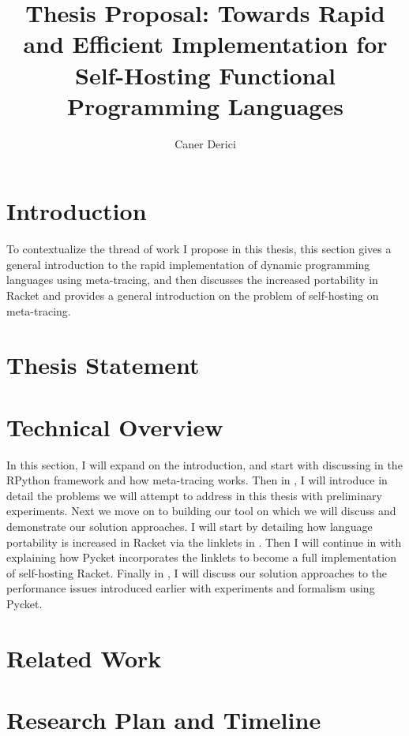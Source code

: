 \documentclass[9pt]{extarticle}
\title{Thesis Proposal: Towards Rapid and Efficient Implementation
  for Self-Hosting Functional Programming Languages}
\author{Caner Derici}
\begin{document}


\maketitle

\begin{abstract}
\end{abstract}

\tableofcontents

\newpage

\section{Introduction}
\label{sec:intro}

To contextualize the thread of work I propose in this thesis, this
section gives a general introduction to the rapid implementation of
dynamic programming languages using meta-tracing, and then discusses
the increased portability in Racket and provides a general
introduction on the problem of self-hosting on meta-tracing.


\section{Thesis Statement}
\label{sec:thesis}


\section{Technical Overview}
\label{sec:technical}

In this section, I will expand on the introduction, and start with
discussing in  the RPython framework and how
meta-tracing works. Then in , I will
introduce in detail the problems we will attempt to address in this
thesis with preliminary experiments. Next we move on to building our
tool on which we will discuss and demonstrate our solution
approaches. I will start by detailing how language portability is
increased in Racket via the linklets in . Then
I will continue in  with explaining how Pycket
incorporates the linklets to become a full implementation of
self-hosting Racket. Finally in , I will
discuss our solution approaches to the performance issues introduced
earlier with experiments and formalism using Pycket.


\section{Related Work}
\label{sec:related}


\section{Research Plan and Timeline}
\label{sec:timeline}


\printbibliography
\end{document}
